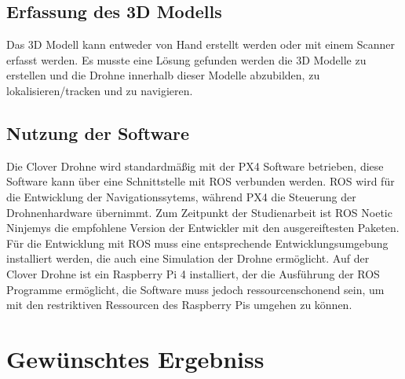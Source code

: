 \subsection{Erfassung des 3D Modells}

Das 3D Modell kann entweder von Hand erstellt werden oder mit einem Scanner erfasst werden. Es musste eine Lösung gefunden werden die 3D Modelle zu erstellen und die Drohne innerhalb dieser Modelle abzubilden, zu lokalisieren/tracken und zu navigieren. 

\subsection{Nutzung der Software}

Die Clover Drohne wird standardmäßig mit der PX4 Software betrieben, diese Software kann über eine Schnittstelle mit \ac{ROS} verbunden werden. \ac{ROS} wird für die Entwicklung der Navigationssytems, während PX4 die Steuerung der Drohnenhardware übernimmt. Zum Zeitpunkt der Studienarbeit ist \ac{ROS} Noetic Ninjemys die empfohlene  Version der Entwickler mit den ausgereiftesten Paketen.
Für die Entwicklung mit \ac{ROS} muss eine entsprechende Entwicklungsumgebung installiert werden, die auch eine Simulation der Drohne ermöglicht. Auf der Clover Drohne ist ein Raspberry Pi 4 installiert, der die Ausführung der \ac{ROS} Programme ermöglicht, die Software muss jedoch ressourcenschonend sein, um mit den restriktiven Ressourcen des Raspberry Pis umgehen zu können. 


\section{Gewünschtes Ergebniss}



